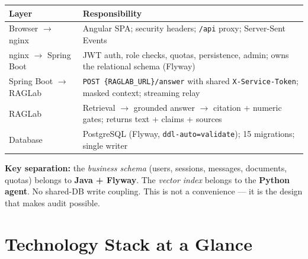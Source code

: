 \documentclass[a4paper,12pt]{report}
\begin{document}
\begin{center}
\small
\begin{tabular}{p{2.8cm}l}
\toprule
\textbf{Layer} & \textbf{Responsibility} \\
\midrule
Browser $\rightarrow$ nginx & Angular SPA; security headers; \texttt{/api} proxy; Server-Sent Events \\
nginx $\rightarrow$ Spring Boot & JWT auth, role checks, quotas, persistence, admin; owns the relational schema (Flyway) \\
Spring Boot $\rightarrow$ RAGLab & \texttt{POST \{RAGLAB\_URL\}/answer} with shared \texttt{X-Service-Token}; masked context; streaming relay \\
RAGLab & Retrieval $\rightarrow$ grounded answer $\rightarrow$ citation + numeric gates; returns text + claims + sources \\
Database & PostgreSQL (Flyway, \texttt{ddl-auto=validate}); 15 migrations; single writer \\
\bottomrule
\end{tabular}
\end{center}

\noindent\textbf{Key separation:} the \textit{business schema} (users, sessions, messages, documents, quotas) belongs to \textbf{Java + Flyway}. The \textit{vector index} belongs to the \textbf{Python agent}. No shared-DB write coupling. This is not a convenience --- it is the design that makes audit possible.

\section{Technology Stack at a Glance}
\end{document}
